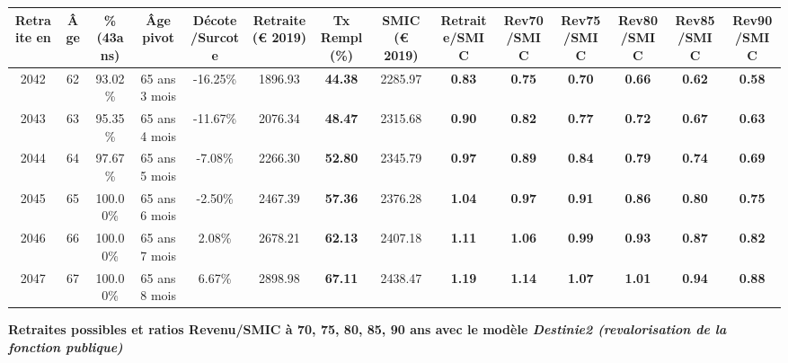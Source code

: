 \begin{adjustbox}{max width=\textwidth} 
\begin{tabular}[htb]{|c|c||c|c|c||c|c||c||c|c|c|c|c|c|} 
\hline 
 Retraite en &  Âge &  \%(43ans) &  Âge pivot &  Décote/Surcote &  Retraite (\euro{} 2019) &  Tx Rempl(\%) &  SMIC (\euro{} 2019) &  Retraite/SMIC &  Rev70/SMIC &  Rev75/SMIC &  Rev80/SMIC &  Rev85/SMIC &  Rev90/SMIC \\ 
\hline \hline 
 2042 &  62 &  93.02\% &  65 ans 3 mois &  -16.25\% &  1896.93 &  {\bf 44.38} &  2285.97 &  {\bf {\color{red} 0.83}} &  {\bf {\color{red} 0.75}} &  {\bf {\color{red} 0.70}} &  {\bf {\color{red} 0.66}} &  {\bf {\color{red} 0.62}} &  {\bf {\color{red} 0.58}} \\ 
\hline 
 2043 &  63 &  95.35\% &  65 ans 4 mois &  -11.67\% &  2076.34 &  {\bf 48.47} &  2315.68 &  {\bf {\color{red} 0.90}} &  {\bf {\color{red} 0.82}} &  {\bf {\color{red} 0.77}} &  {\bf {\color{red} 0.72}} &  {\bf {\color{red} 0.67}} &  {\bf {\color{red} 0.63}} \\ 
\hline 
 2044 &  64 &  97.67\% &  65 ans 5 mois &  -7.08\% &  2266.30 &  {\bf 52.80} &  2345.79 &  {\bf {\color{red} 0.97}} &  {\bf {\color{red} 0.89}} &  {\bf {\color{red} 0.84}} &  {\bf {\color{red} 0.79}} &  {\bf {\color{red} 0.74}} &  {\bf {\color{red} 0.69}} \\ 
\hline 
 2045 &  65 &  100.00\% &  65 ans 6 mois &  -2.50\% &  2467.39 &  {\bf 57.36} &  2376.28 &  {\bf 1.04} &  {\bf {\color{red} 0.97}} &  {\bf {\color{red} 0.91}} &  {\bf {\color{red} 0.86}} &  {\bf {\color{red} 0.80}} &  {\bf {\color{red} 0.75}} \\ 
\hline 
 2046 &  66 &  100.00\% &  65 ans 7 mois &  2.08\% &  2678.21 &  {\bf 62.13} &  2407.18 &  {\bf 1.11} &  {\bf 1.06} &  {\bf {\color{red} 0.99}} &  {\bf {\color{red} 0.93}} &  {\bf {\color{red} 0.87}} &  {\bf {\color{red} 0.82}} \\ 
\hline 
 2047 &  67 &  100.00\% &  65 ans 8 mois &  6.67\% &  2898.98 &  {\bf 67.11} &  2438.47 &  {\bf 1.19} &  {\bf 1.14} &  {\bf 1.07} &  {\bf 1.01} &  {\bf {\color{red} 0.94}} &  {\bf {\color{red} 0.88}} \\ 
\hline 
\hline 
\end{tabular} 
\end{adjustbox} 
 
 \vspace{0.1cm} 
{\bf \noindent Retraites possibles et ratios Revenu/SMIC à 70, 75, 80, 85, 90 ans avec le modèle \emph{Destinie2 (revalorisation de la fonction publique)}}  
 
